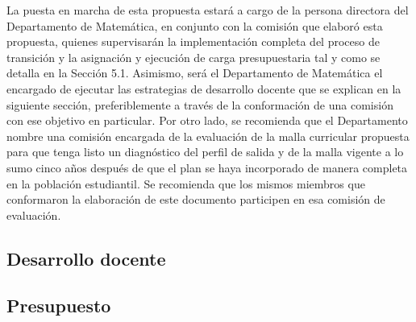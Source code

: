 La puesta en marcha de esta propuesta estará a cargo de la persona directora del Departamento de Matemática, en conjunto con la comisión que elaboró esta propuesta, quienes supervisarán la implementación completa del proceso de transición y la asignación y ejecución de carga presupuestaria tal y como se detalla en la Sección 5.1. Asimismo, será el Departamento de Matemática el encargado de ejecutar las estrategias de desarrollo docente que se explican en la siguiente sección, preferiblemente a través de la conformación de una comisión con ese objetivo en particular. 
Por otro lado, se recomienda que el Departamento nombre una comisión encargada de la evaluación de la malla curricular propuesta para que tenga listo un diagnóstico del perfil de salida y de la malla vigente a lo sumo cinco años después de que el plan se haya incorporado de manera completa en la población estudiantil. Se recomienda que los mismos miembros que conformaron la elaboración de este documento participen en esa comisión de evaluación.

\subsection{Desarrollo docente}

\subsection{Presupuesto}
